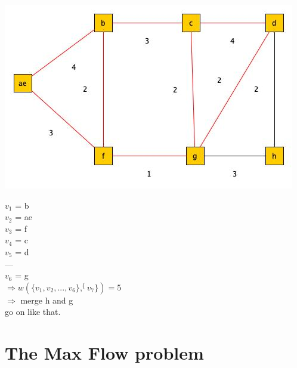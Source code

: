 \begin{center}
	\includegraphics[scale=0.5]{img/graph3}
\end{center}

$v_1$ = b\\
$v_2$ = ae\\
$v_3$ = f\\
$v_4$ = c\\
$v_5$ = d  \\
---  \\
$v_6$ = g \\

$\Rightarrow w(\{v_1,v_2,...,v_6\},^\{v_7\}) = 5$ \\

$\Rightarrow$ merge h and g \\

go on like that.

\newpage
\section{The Max Flow problem}

